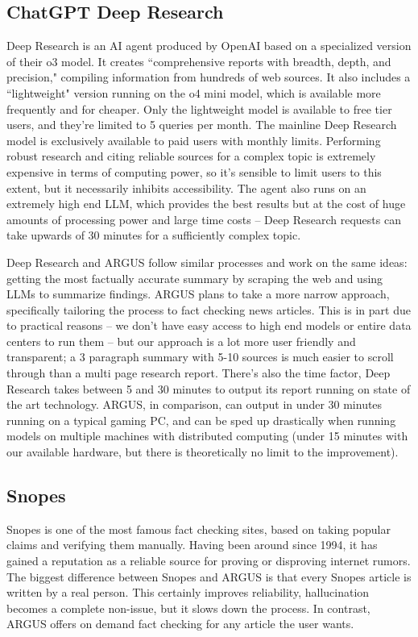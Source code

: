 \documentclass[conference]{IEEEtran}
\begin{document}
\subsection{ChatGPT Deep Research}
Deep Research is an AI agent produced by OpenAI based on a specialized version of their o3 model\cite{introducingDR}. It creates ``comprehensive reports with breadth, depth, and precision," compiling information from hundreds of web sources\cite{DeepResearch}. It also includes a ``lightweight" version running on the o4 mini model, which is available more frequently and for cheaper. Only the lightweight model is available to free tier users, and they're limited to 5 queries per month. The mainline Deep Research model is exclusively available to paid users with monthly limits. Performing robust research and citing reliable sources for a complex topic is extremely expensive in terms of computing power, so it's sensible to limit users to this extent, but it necessarily inhibits accessibility. The agent also runs on an extremely high end LLM, which provides the best results but at the cost of huge amounts of processing power and large time costs -- Deep Research requests can take upwards of 30 minutes for a sufficiently complex topic\cite{DeepResearch}.

Deep Research and ARGUS follow similar processes and work on the same ideas: getting the most factually accurate summary by scraping the web and using LLMs to summarize findings. ARGUS plans to take a more narrow approach, specifically tailoring the process to fact checking news articles. This is in part due to practical reasons -- we don't have easy access to high end models or entire data centers to run them -- but our approach is a lot more user friendly and transparent; a 3 paragraph summary with 5-10 sources is much easier to scroll through than a multi page research report. There's also the time factor, Deep Research takes between 5 and 30 minutes to output its report running on state of the art technology. ARGUS, in comparison, can output in under 30 minutes running on a typical gaming PC, and can be sped up drastically when running models on multiple machines with distributed computing (under 15 minutes with our available hardware, but there is theoretically no limit to the improvement).

\subsection{Snopes}
Snopes is one of the most famous fact checking sites, based on taking popular claims and verifying them manually\cite{Snopes}. Having been around since 1994, it has gained a reputation as a reliable source for proving or disproving internet rumors\cite{Snopes}. The biggest difference between Snopes and ARGUS is that every Snopes article is written by a real person. This certainly improves reliability, hallucination becomes a complete non-issue, but it slows down the process. In contrast, ARGUS offers on demand fact checking for any article the user wants.
\end{document}

